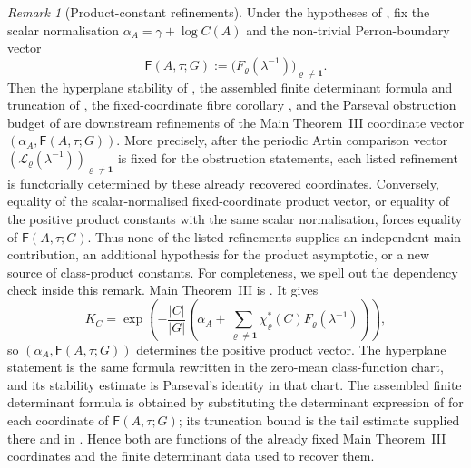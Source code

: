 \documentclass[11pt,a4paper]{amsart}
\theoremstyle{plain}
\theoremstyle{definition}
\theoremstyle{remark}
\newtheorem{remark}[theorem]{Remark}
\begin{document}
\begin{remark}[Product-constant refinements]
  Under the hypotheses of , fix the
  scalar normalisation \(\alpha_A=\gamma+\log C(A)\) and the non-trivial
  Perron-boundary vector
  \[
    \mathsf F(A,\tau;G):=
    \bigl(F_\varrho(\lambda^{-1})\bigr)_{\varrho\ne\mathbf1}.
  \]
  Then the hyperplane stability of
  , the assembled finite
  determinant formula and truncation of
  , the fixed-coordinate
  fibre corollary ,
  and the Parseval
  obstruction budget of  are downstream
  refinements of the Main Theorem~III coordinate vector
  \((\alpha_A,\mathsf F(A,\tau;G))\).  More precisely, after the periodic
  Artin comparison vector
  \((\mathcal L_\varrho(\lambda^{-1}))_{\varrho\ne\mathbf1}\) is fixed for
  the obstruction statements, each listed refinement is functorially
  determined by these already recovered coordinates.  Conversely, equality of
  the scalar-normalised fixed-coordinate product vector, or equality of the
  positive product
  constants with the same scalar normalisation, forces equality of
  \(\mathsf F(A,\tau;G)\).  Thus none of the listed refinements supplies an
  independent main contribution, an additional hypothesis for the product
  asymptotic, or a new source of class-product constants.
  For completeness, we spell out the dependency check inside this remark.
  Main Theorem~III is .  It gives
  \[
    K_C=
    \exp\!\left(-\frac{|C|}{|G|}
      \left(\alpha_A+
        \sum_{\varrho\ne\mathbf1}\chi_\varrho^\ast(C)
          F_\varrho(\lambda^{-1})\right)
      \right),
  \]
  so \((\alpha_A,\mathsf F(A,\tau;G))\) determines the positive product
  vector.  The hyperplane statement is the same formula rewritten in the
  zero-mean class-function chart, and its stability estimate is Parseval's
  identity in that chart.  The assembled finite determinant formula is obtained
  by substituting the determinant expression of
   for each coordinate of
  \(\mathsf F(A,\tau;G)\); its truncation bound is the tail estimate supplied
  there and in .  Hence both are
  functions of the already fixed Main Theorem~III coordinates and the finite
  determinant data used to recover them.


\end{remark}
\end{document}
